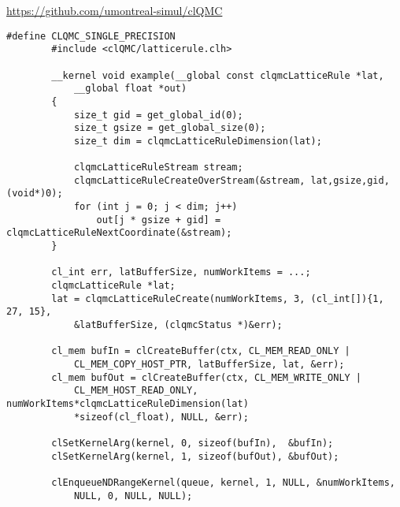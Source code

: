             \url{https://github.com/umontreal-simul/clQMC}
            \begin{lstlisting}[caption=clQMC Beispiel]    
        #define CLQMC_SINGLE_PRECISION                                 
        #include <clQMC/latticerule.clh>                               
                                                                       
        __kernel void example(__global const clqmcLatticeRule *lat, 
            __global float *out)                     
        {                                                              
            size_t gid = get_global_id(0);                                
            size_t gsize = get_global_size(0);                            
            size_t dim = clqmcLatticeRuleDimension(lat);                  
                                                                       
            clqmcLatticeRuleStream stream;                             
            clqmcLatticeRuleCreateOverStream(&stream, lat,gsize,gid, (void*)0);                 
            for (int j = 0; j < dim; j++) 
                out[j * gsize + gid] = clqmcLatticeRuleNextCoordinate(&stream); 
        }
			
        cl_int err, latBufferSize, numWorkItems = ...;
        clqmcLatticeRule *lat;               
        lat = clqmcLatticeRuleCreate(numWorkItems, 3, (cl_int[]){1, 27, 15}, 
            &latBufferSize, (clqmcStatus *)&err);  

        cl_mem bufIn = clCreateBuffer(ctx, CL_MEM_READ_ONLY | 
            CL_MEM_COPY_HOST_PTR, latBufferSize, lat, &err);
        cl_mem bufOut = clCreateBuffer(ctx, CL_MEM_WRITE_ONLY | 
            CL_MEM_HOST_READ_ONLY, numWorkItems*clqmcLatticeRuleDimension(lat) 
            *sizeof(cl_float), NULL, &err);
            
        clSetKernelArg(kernel, 0, sizeof(bufIn),  &bufIn);
        clSetKernelArg(kernel, 1, sizeof(bufOut), &bufOut);

        clEnqueueNDRangeKernel(queue, kernel, 1, NULL, &numWorkItems, 
            NULL, 0, NULL, NULL);
            \end{lstlisting}